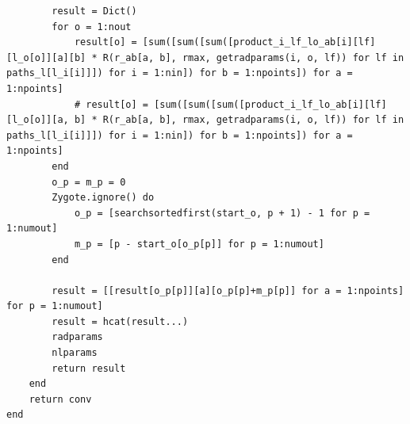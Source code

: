 \documentclass[book.tex]{subfiles}
\begin{document}
\begin{lstlisting}
        result = Dict()
        for o = 1:nout
            result[o] = [sum([sum([sum([product_i_lf_lo_ab[i][lf][l_o[o]][a][b] * R(r_ab[a, b], rmax, getradparams(i, o, lf)) for lf in paths_l[l_i[i]]]) for i = 1:nin]) for b = 1:npoints]) for a = 1:npoints]
            # result[o] = [sum([sum([sum([product_i_lf_lo_ab[i][lf][l_o[o]][a, b] * R(r_ab[a, b], rmax, getradparams(i, o, lf)) for lf in paths_l[l_i[i]]]) for i = 1:nin]) for b = 1:npoints]) for a = 1:npoints]
        end
        o_p = m_p = 0
        Zygote.ignore() do
            o_p = [searchsortedfirst(start_o, p + 1) - 1 for p = 1:numout]
            m_p = [p - start_o[o_p[p]] for p = 1:numout]
        end
    
        result = [[result[o_p[p]][a][o_p[p]+m_p[p]] for a = 1:npoints] for p = 1:numout]
        result = hcat(result...)
        radparams
        nlparams
        return result
    end
    return conv
end
\end{lstlisting}
\end{document}
